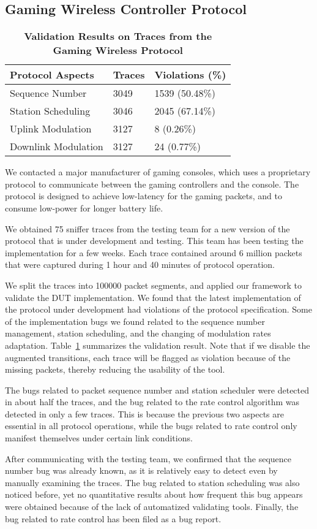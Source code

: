 \subsection{Gaming Wireless Controller Protocol}
\label{subsec:xbox}

\begin{table}[t!]
  \centering
  \begin{tabular}{lll}
    \toprule
    \textbf{Protocol Aspects} & \textbf{Traces} & \textbf{Violations (\%)}\\
    \midrule
    Sequence Number & 3049 & 1539 (50.48\%) \\
    Station Scheduling & 3046 & 2045 (67.14\%) \\
    Uplink Modulation & 3127 & 8 (0.26\%) \\
    Downlink Modulation & 3127 & 24 (0.77\%) \\
    \bottomrule
  \end{tabular}
  \caption{\textbf{Validation Results on Traces from the Gaming Wireless Protocol}}
  \label{tab:xbox}
\end{table}

We contacted a major manufacturer of gaming consoles, which uses 
a proprietary protocol to communicate between the gaming controllers
and the console.  The protocol is designed to achieve low-latency for
the gaming packets, and to consume low-power for longer battery life.

We obtained 75 sniffer traces from the testing team for a new version
of the protocol that is under development and testing. This team has
been testing the implementation for a few weeks.  Each trace contained
around 6 million packets that were captured during 1 hour and 40
minutes of protocol operation.

We split the traces into \num{100000} packet segments, and applied our
framework to validate the DUT implementation. We found that the latest
implementation of the protocol under development had violations of the
protocol specification. Some of the implementation bugs we found
related to the sequence number management, station scheduling, and the
changing of modulation rates adaptation. Table~\ref{tab:xbox}
summarizes the validation result. Note that if we disable the
augmented transitions, each trace will be flagged as violation because
of the missing packets, thereby reducing the usability of the tool.

The bugs related to packet sequence number and station scheduler were
detected in about half the traces, and the bug related to the rate
control algorithm was detected in only a few traces. This is because
the previous two aspects are essential in all protocol operations,
while the bugs related to rate control only manifest themselves under
certain link conditions.

After communicating with the testing team, we confirmed that the
sequence number bug was already known, as it is relatively easy to
detect even by manually examining the traces. The bug related to
station scheduling was also noticed before, yet no quantitative
results about how frequent this bug appears were obtained because of
the lack of automatized validating tools. Finally, the bug related to
rate control has been filed as a bug report.
